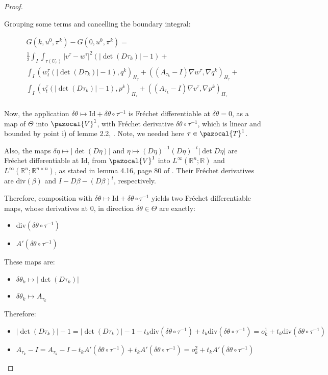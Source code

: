 \documentclass[english,a4paper,9pt,oneside]{scrbook}	%
\theoremstyle{break}
\newenvironment{mproof}[1][\proofname]{%
  \begin{proof}[#1]$ $\par\nobreak\ignorespaces
}{%
  \end{proof}
}
\renewcommand*{\proofname}{Proof}
\theoremstyle{remark}
\newcommand{\mR}{\mathbb{R}}
\newcommand{\cV}{\pazocal{V}}
\newcommand{\cT}{\pazocal{T}}
\newcommand{\id}{\text{Id}}
\newcommand{\te}{\theta}
\newcommand{\Te}{\Theta}
\newcommand{\dive}{\text{div}}
\begin{document}
\begin{mproof}
Grouping some terms and cancelling the boundary integral:

\begin{align*}
G(k,u^0,\pi^k)-G(0,u^0,\pi^k) =\\
\frac{1}{2}\int_I \int_{\tau(U_r)}|v^\tau-w^\tau|^2(|\det(D\tau_k)|-1)+\\
\int_I ( w_t^\tau (|\det(D\tau_k)| -1), q^k)_{H_\tau}+ ((A_{\tau_k}-I)\nabla w^\tau, \nabla q^k)_{H_\tau}+\\
\int_I (v_t^\tau (|\det(D\tau_k)|-1),p^k )_{H_\tau} + ((A_{\tau_k}-I) \nabla v^\tau, \nabla p^k)_{H_\tau} \\
\end{align*}

Now, the application $\delta \te \mapsto \id +\delta \te \circ \tau^{-1}$ is Fréchet differentiable at $\delta \te =0$, as a map of $\Te$ into $\cV^1$, with Fréchet derivative $\delta \te \circ \tau^{-1}$, which is linear and bounded by point i) of lemme 2.2, \cite{murat}. Note, we needed here $\tau \in \cT^1$.

Also, the maps $\delta \eta \mapsto |\det(D\eta)|$ and $\eta\mapsto (D\eta)^{-1}(D\eta)^{-t}|\det D\eta|$ are Fréchet differentiable at $\id$, from $\cV^1$ into $L^\infty(\mR^n;\mR)$ and $L^\infty(\mR^n;\mR^{n\times n})$, as stated in lemma 4.16, page 80 of \cite{lindemann}. Their Fréchet derivatives are $\dive (\beta)$ and $I-D\beta-(D\beta)^t$, respectively.

Therefore, composition with  $\delta \te  \mapsto \id+ \delta \te \circ \tau^{-1}$ yields two Fréchet differentiable maps, whose derivatives at $0$, in direction $\delta \te \in \Te$ are exactly:

\begin{itemize}
	\item $\dive(\delta \te \circ \tau^{-1})$
	\item $A'(\delta \te \circ \tau^{-1})$
\end{itemize} 

These maps are:

\begin{itemize}
	\item $\delta \te_k \mapsto |\det(D\tau_k)|$
	\item $\delta \te_k \mapsto A_{\tau_k}$
\end{itemize}

Therefore:

\begin{itemize}
	\item $|\det(D\tau_k)|-1 = |\det(D\tau_k)|-1 - t_k\dive(\delta \te \circ \tau^{-1})+t_k\dive(\delta \te \circ \tau^{-1}) = o^1_k + t_k\dive(\delta \te \circ \tau^{-1})$
	\item $A_{\tau_k}-I = A_{\tau_k}-I - t_k A'(\delta \te \circ \tau^{-1}) + t_k A'(\delta \te \circ \tau^{-1}) = o_k^2 + t_k A'(\delta \te \circ \tau^{-1}) $
\end{itemize}


\end{mproof}
\end{document}
